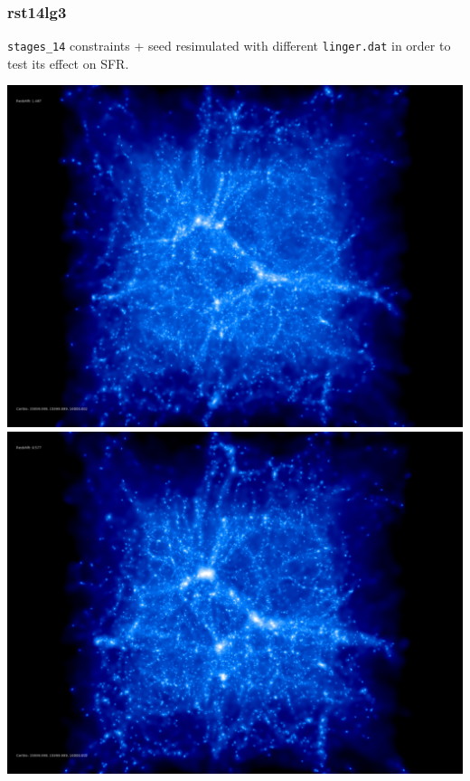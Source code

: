 % 
%
%
%
%
%
%
%

\newpage

\subsubsection{rst14lg3}
\texttt{stages\_14} constraints + seed resimulated with different \texttt{linger.dat} in order
to test its effect on SFR. 

\includegraphics[scale=0.1]{r256/h100/red_st14_log2/50.jpg} 
\includegraphics[scale=0.1]{r256/h100/red_st14_log2/100.jpg} \\ 
